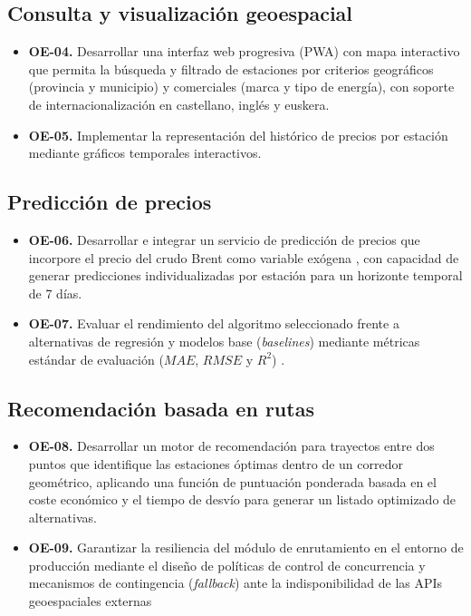 \subsection{Consulta y visualización geoespacial}

\begin{itemize}
      \item \textbf{OE-04.} Desarrollar una interfaz web progresiva (PWA)
            con mapa interactivo que permita la búsqueda y filtrado de estaciones
            por criterios geográficos (provincia y municipio) y comerciales (marca y tipo de energía),
            con soporte de internacionalización en castellano, inglés y euskera.

      \item \textbf{OE-05.} Implementar la representación del histórico de
            precios por estación mediante gráficos temporales interactivos.
\end{itemize}

\subsection{Predicción de precios}

\begin{itemize}
      \item \textbf{OE-06.} Desarrollar e integrar un servicio de predicción de precios que
            incorpore el precio del crudo Brent como variable exógena \cite{LAHMIRI2024105008},
            con capacidad de generar predicciones individualizadas por estación para un horizonte temporal de 7 días.
      \item \textbf{OE-07.} Evaluar el rendimiento del algoritmo seleccionado frente a
            alternativas de regresión y modelos base (\textit{baselines}) mediante métricas
            estándar de evaluación ($MAE$, $RMSE$ y $R^2$) \cite{s24124013}.
\end{itemize}

\subsection{Recomendación basada en rutas}

\begin{itemize}
      \item \textbf{OE-08.} Desarrollar un motor de recomendación para trayectos entre dos puntos que identifique las estaciones óptimas dentro de un corredor geométrico, aplicando una función de puntuación ponderada basada en el coste económico y el tiempo de desvío para generar un listado optimizado de alternativas.
      \item \textbf{OE-09.} Garantizar la resiliencia del módulo de enrutamiento en el entorno de producción mediante el diseño de políticas de control de concurrencia y mecanismos de contingencia (\textit{fallback}) ante la indisponibilidad de las APIs geoespaciales externas
\end{itemize}

